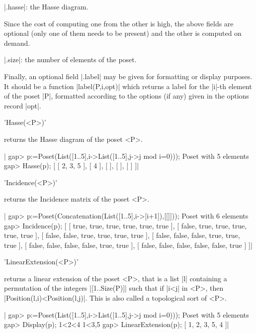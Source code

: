   |.hasse|: the Hasse diagram.

Since the cost of computing one from the other is high, the above fields are
optional (only one of them needs to be present) and the other is computed on
demand.

  |.size|: the number of elements of the poset.

Finally,  an optional field |.label| may be given for formatting or display
purposes.  It should be  a function |label(P,i,opt)|  which returns a label
for the |i|-th element of the poset |P|, formatted according to the options
(if any) given in the options record |opt|.

%

'Hasse(<P>)'

returns the Hasse diagram of the poset <P>.

|    gap> p:=Poset(List([1..5],i->List([1..5],j->j mod i=0)));                  
    Poset with 5 elements
    gap> Hasse(p);
    [ [ 2, 3, 5 ], [ 4 ], [  ], [  ], [  ] ]|

%

'Incidence(<P>)'

returns the Incidence matrix of the poset <P>.

|    gap> p:=Poset(Concatenation(List([1..5],i->[i+1]),[[]]));
    Poset with 6 elements
    gap> Incidence(p);
    [ [ true, true, true, true, true, true ], 
      [ false, true, true, true, true, true ], 
      [ false, false, true, true, true, true ], 
      [ false, false, false, true, true, true ], 
      [ false, false, false, false, true, true ], 
      [ false, false, false, false, false, true ] ]|

%

'LinearExtension(<P>)'

returns  a linear extension of the poset <P>, that is a list |l| containing
a  permutation of  the integers  |[1..Size(P)]| such  that if |i<j| in <P>,
then |Position(l,i)<Position(l,j)|. This is also called a topological sort
of <P>.

|    gap> p:=Poset(List([1..5],i->List([1..5],j->j mod i=0))); 
    Poset with 5 elements
    gap> Display(p);
    1<2<4
    1<3,5
    gap> LinearExtension(p);
    [ 1, 2, 3, 5, 4 ]|

